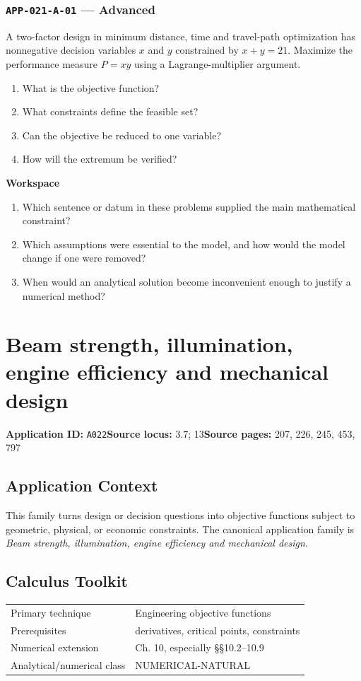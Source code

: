 \documentclass[11pt]{book}
\newcommand{\pid}[1]{\texttt{#1}}
\newcommand{\workspace}{\par\vspace{0.7in}\hrulefill\par\vspace{0.55in}\hrulefill\par}
\begin{document}
\subsection*{\pid{APP-021-A-01} — Advanced}
\begin{problembox}
A two-factor design in minimum distance, time and travel-path optimization has nonnegative decision variables $x$ and $y$ constrained by $x+y=21$. Maximize the performance measure $P=xy$ using a Lagrange-multiplier argument.
\end{problembox}
\begin{promptbox}\begin{enumerate}
\item What is the objective function?
\item What constraints define the feasible set?
\item Can the objective be reduced to one variable?
\item How will the extremum be verified?
\end{enumerate}\end{promptbox}
\textbf{Workspace}\workspace
\begin{reflectionbox}\begin{enumerate}
\item Which sentence or datum in these problems supplied the main mathematical constraint?
\item Which assumptions were essential to the model, and how would the model change if one were removed?
\item When would an analytical solution become inconvenient enough to justify a numerical method?
\end{enumerate}\end{reflectionbox}
\chapter{Beam strength, illumination, engine efficiency and mechanical design}\label{app:A022}
\textbf{Application ID:} \pid{A022}\quad \textbf{Source locus:} 3.7; 13\quad \textbf{Source pages:} 207, 226, 245, 453, 797
\section*{Application Context}
This family turns design or decision questions into objective functions subject to geometric, physical, or economic constraints. The canonical application family is \emph{Beam strength, illumination, engine efficiency and mechanical design}.
\section*{Calculus Toolkit}
\begin{tabularx}{\textwidth}{@{}lX@{}}\toprule
Primary technique & Engineering objective functions \\
Prerequisites & derivatives, critical points, constraints \\
Numerical extension & Ch. 10, especially §§10.2–10.9 \\
Analytical/numerical class & NUMERICAL-NATURAL \\
\bottomrule\end{tabularx}
\end{document}
